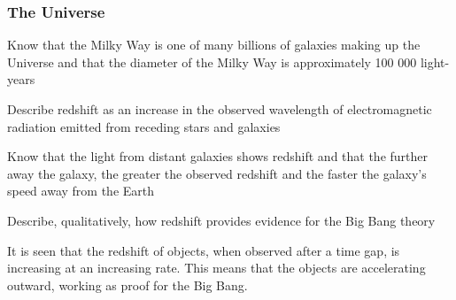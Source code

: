 \subsubsection{The Universe}
\begin{subpoint}
Know that the Milky Way is one of many billions of galaxies making up the Universe and that the diameter
of the Milky Way is approximately 100 000 light-years
\end{subpoint}

\begin{subpoint}
Describe redshift as an increase in the observed wavelength of electromagnetic radiation emitted from
receding stars and galaxies
\end{subpoint}

\begin{subpoint}
Know that the light from distant galaxies shows redshift and that the further away the galaxy, the greater
the observed redshift and the faster the galaxy’s speed away from the Earth
\end{subpoint}

\begin{subpoint}
Describe, qualitatively, how redshift provides evidence for the Big Bang theory
\end{subpoint}

It is seen that the redshift of objects, when observed after a time gap, is increasing
at an increasing rate. This means that the objects are accelerating outward, working
as proof for the Big Bang.
